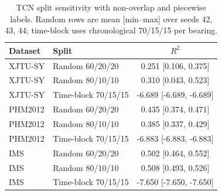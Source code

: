 \begin{table}[!ht]
\centering
\caption{TCN split sensitivity with non-overlap and piecewise labels. Random rows are mean [min--max] over seeds 42, 43, 44; time-block uses chronological 70/15/15 per bearing.}
\label{tab:sensitivity_nonoverlap}
\small
\begin{tabular}{llc}
\toprule
Dataset & Split & $R^2$ \\
\midrule
\midrule
XJTU-SY & Random 60/20/20 & 0.251 [0.106, 0.375] \\
XJTU-SY & Random 80/10/10 & 0.310 [0.043, 0.523] \\
XJTU-SY & Time-block 70/15/15 & -6.689 [-6.689, -6.689] \\
\midrule
PHM2012 & Random 60/20/20 & 0.435 [0.374, 0.471] \\
PHM2012 & Random 80/10/10 & 0.385 [0.337, 0.429] \\
PHM2012 & Time-block 70/15/15 & -6.883 [-6.883, -6.883] \\
\midrule
IMS & Random 60/20/20 & 0.502 [0.464, 0.552] \\
IMS & Random 80/10/10 & 0.508 [0.493, 0.526] \\
IMS & Time-block 70/15/15 & -7.650 [-7.650, -7.650] \\
\bottomrule
\end{tabular}
\end{table}
